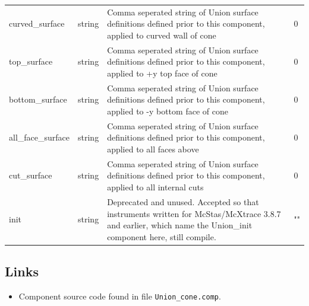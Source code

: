 \begin{longtable}{p{}p{}p{}p{}}
curved\_surface & string & Comma seperated string of Union surface definitions defined prior to this component, applied to curved wall of cone & 0 \\
top\_surface & string & Comma seperated string of Union surface definitions defined prior to this component, applied to +y top face of cone & 0 \\
bottom\_surface & string & Comma seperated string of Union surface definitions defined prior to this component, applied to -y bottom face of cone & 0 \\
all\_face\_surface & string & Comma seperated string of Union surface definitions defined prior to this component, applied to all faces above & 0 \\
cut\_surface & string & Comma seperated string of Union surface definitions defined prior to this component, applied to all internal cuts & 0 \\
init & string & Deprecated and unused. Accepted so that instruments written for McStas/McXtrace 3.8.7 and earlier, which name the Union\_init component here, still compile. & "" \\
\bottomrule
\end{longtable}

\subsection*{Links}
\begin{itemize}
  \item Component source code found in file \texttt{Union\_cone.comp}.
\end{itemize}
